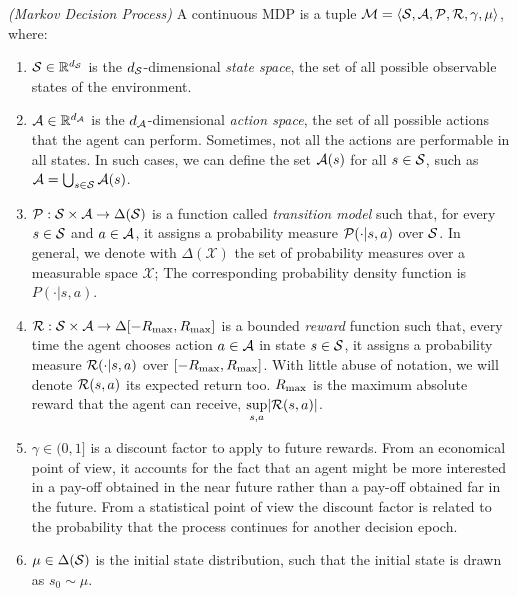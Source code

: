 \begin{definition} \emph{(Markov Decision Process)}
A continuous \gls{MDP} \cite{puterman2014markov, sutton2018reinforcement} is a tuple $\mathcal{M} = \langle\mathcal{S},\mathcal{A},\mathcal{P},\mathcal{R},\gamma,\mu\rangle$, where:

\begin{enumerate}
\item $\mathcal{S}\in\mathbb{R}^{d_{\mathcal{S}}}$ is the $d_{\mathcal{S}}$-dimensional \emph{state space}, \ie the set of all possible observable states of the environment.
\item $\mathcal{A}\in\mathbb{R}^{d_{\mathcal{A}}}$ is the $d_{\mathcal{A}}$-dimensional \emph{action space}, \ie the set of all possible actions that the agent can perform. Sometimes, not all the actions are performable in all states. In such cases, we can define the set $\mathcal{A}(s)$ for all $s \in \mathcal{S}$, such as  $\mathcal{A} = \bigcup_{s \in \mathcal{S}} \mathcal{A}(s)$.
\item  $\mathcal{P}:\mathcal{S}\times\mathcal{A}\to\Delta(\mathcal{S})$ is a function called \emph{transition model} such that, for every $s\in\mathcal{S}$ and $a\in\mathcal{A}$, it assigns a probability measure $\mathcal{P}(\cdot|s,a)$ over $\mathcal{S}$. In general, we denote with $\Delta(\mathcal{X})$ the set of probability measures over a measurable space $\mathcal{X}$; The corresponding probability density function is $P(\cdot|s,a)$.
\item $\mathcal{R}:\mathcal{S}\times\mathcal{A}\to\Delta[-R_{\max},R_{\max}]$ is a bounded \emph{reward} function such that, every time the agent chooses action $a\in\mathcal{A}$ in state $s\in\mathcal{S}$, it assigns a probability measure $\mathcal{R}(\cdot|s,a)$ over $[-R_{\max},R_{\max}]$. With little abuse of notation, we will denote $\mathcal{R}(s,a)$ its expected return too. $R_{\max}$ is the maximum absolute reward that the agent can receive, \ie $\underset{s,a}{\sup}|\mathcal{R}(s,a)|$.
\item $\gamma\in(0,1]$ is a discount factor to apply to future rewards. From an economical point of view, it accounts for the fact that an agent might be more interested in a pay-off obtained in the near future rather than a pay-off obtained far in the future. From a statistical point of view the discount factor is related to the probability that the process continues for another decision epoch.
\item $\mu\in\Delta(\mathcal{S})$ is the initial state distribution, such that the initial state is drawn as $s_0\sim\mu$.
\end{enumerate}
\end{definition}

